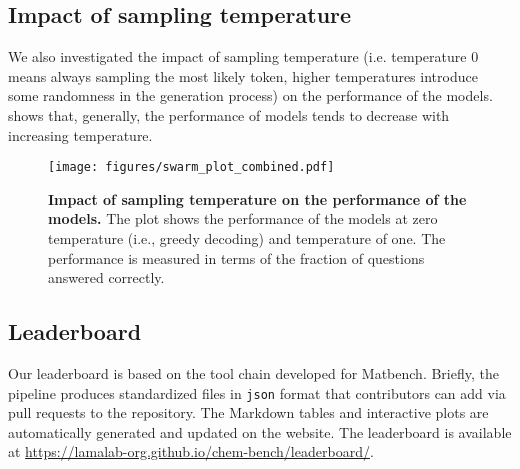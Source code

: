 \clearpage
\subsection{Impact of sampling temperature}
We also investigated the impact of sampling temperature (i.e. temperature 0 means always sampling the most likely token, higher temperatures introduce some randomness in the generation process) on the performance of the models.  shows that, generally, the performance of models tends to decrease with increasing temperature.

\begin{figure}[!h]
    \centering
    \texttt{[image: figures/swarm\_plot\_combined.pdf]}
    \caption{\textbf{Impact of sampling temperature on the performance of the models.} The plot shows the performance of the models at zero temperature (i.e., greedy decoding) and temperature of one. The performance is measured in terms of the fraction of questions answered correctly.}
    \label{fig:temperature_impact}
\end{figure}





\clearpage
\subsection{Leaderboard}
\label{sec:leaderboard}
Our leaderboard is based on the tool chain developed for Matbench.\autocite{Dunn_2020}
Briefly, the \chembench pipeline produces standardized files in \texttt{json} format that contributors can add via pull requests to the \chembench repository.
The Markdown tables and interactive plots are automatically generated and updated on the \chembench website. The leaderboard is available at \url{https://lamalab-org.github.io/chem-bench/leaderboard/}.

\clearpage

\printnoidxglossary[type=\acronymtype, nonumberlist]  %
